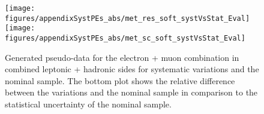 \begin{figure}[!hb]
\begin{center}
        
        \texttt{[image: figures/appendixSystPEs\_abs/met\_res\_soft\_systVsStat\_Eval]}\\
        \texttt{[image: figures/appendixSystPEs\_abs/met\_sc\_soft\_systVsStat\_Eval]}\\
  
\caption{Generated pseudo-data for the electron + muon combination in combined leptonic + hadronic sides for systematic variations and the nominal \ttbar sample. The bottom plot shows the relative difference between the variations and the nominal sample in comparison to the statistical uncertainty of the nominal sample.}   
\label{fig:systematicVar_lephad_MET}
\end{center}                          
\end{figure}

\clearpage
